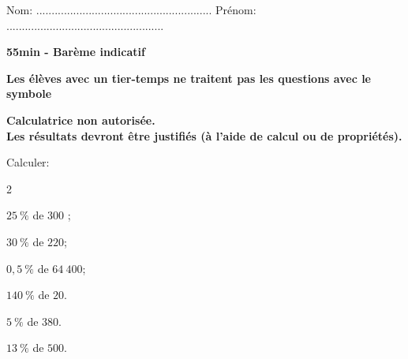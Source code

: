 \documentclass[11pt,a4paper]{article}  %
\begin{document}
	\graphicspath{{images/}}
	
	\noindent Nom: ${\scriptstyle  .........................................................}$ \hskip 1.8cm Prénom: ${\scriptstyle  ...................................................}$ 
	
	\vspace{.5cm}
	
	\begin{center}
		
		
	\end{center}

\begin{center}\textbf{55min - Barème indicatif}\end{center}
\begin{center}\textbf{Les élèves avec un tier-temps ne traitent pas les questions avec  le symbole }\end{center}
\begin{center}\textbf{Calculatrice non autorisée.\\Les résultats devront être justifiés (à l'aide de calcul ou de propriétés).}\end{center}




Calculer:
\begin{multicols}{2}
	\begin{enumMet}
		\item $25\ \%$ de $300$ ;
		\item {} $30\ \%$ de $220$;
		\item $0,5\ \%$ de $64\ 400$;
		\item $140\ \%$ de $20$.
		\item $5\ \%$ de $380$.
		\item $13\ \%$ de $500$.
	\end{enumMet}
\end{multicols}
\end{document}
